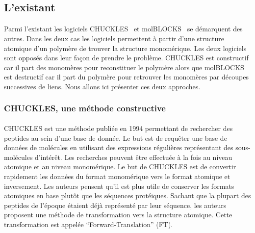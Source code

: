 \documentclass[12pt,french,twoside]{report}
\begin{document}
\subsection{L'existant}

\paragraph{}Parmi l'existant les logiciels CHUCKLES~\cite{siani_chuckles:_1994} et molBLOCKS~\cite{ghersi_molblocks:_2014} se démarquent des autres.
Dans les deux cas les logiciels permettent à partir d'une structure atomique d'un polymère de trouver la structure monomérique.
Les deux logiciels sont opposés dans leur façon de prendre le problème.
CHUCKLES est constructif car il part des monomères pour reconstituer le polymère alors que molBLOCKS est destructif car il part du polymère pour retrouver les monomères par découpes successives de liens.
Nous allons ici présenter ces deux approches.


\subsubsection{CHUCKLES, une méthode constructive}

\paragraph{}CHUCKLES est une méthode publiée en 1994 permettant de rechercher des peptides au sein d'une base de donnée.
Le but est de requêter une base de données de molécules en utilisant des expressions régulières représentant des sous-molécules d'intérêt.
Les recherches peuvent être effectuée à la fois au niveau atomique et au niveau monomérique.
Le but de CHUCKLES est de convertir rapidement les données du format monomérique vers le format atomique et inversement.
Les auteurs pensent qu'il est plus utile de conserver les formats atomiques en base plutôt que les séquences protéiques.
Sachant que la plupart des peptides de l'époque étaient déjà représenté par leur séquence, les auteurs proposent une méthode de transformation vers la structure atomique.
Cette transformation est appelée ``Forward-Translation'' (FT).
\end{document}
